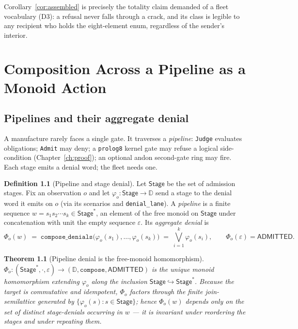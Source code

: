 \documentclass[11pt,oneside]{book}
\theoremstyle{definition}
\newtheorem{definition}{Definition}[chapter]
\theoremstyle{plain}
\newtheorem{theorem}{Theorem}[chapter]
\theoremstyle{remark}
\newcommand{\code}[1]{\texttt{#1}}
\newcommand{\Deny}{\mathbb{D}}                 %
\newcommand{\Adml}{\mathsf{ADMITTED}}          %
\begin{document}
Corollary~\ref{cor:assembled} is precisely the totality claim demanded of a fleet vocabulary
(D3): a refusal never falls through a crack, and its class is legible to any recipient who
holds the eight-element enum, regardless of the sender's interior.

\chapter{Composition Across a Pipeline as a Monoid Action}
\label{ch:pipe}

\section{Pipelines and their aggregate denial}

A manufacture rarely faces a single gate. It traverses a \emph{pipeline}: \code{Judge}
evaluates obligations; \code{Admit} may deny; a \code{prolog8} kernel gate may refuse a logical
side-condition (Chapter~\ref{ch:proof}); an optional andon second-gate ring may fire. Each
stage emits a denial word; the fleet needs one.

\begin{definition}[Pipeline and stage denial]\label{def:pipeline}
Let $\mathsf{Stage}$ be the set of admission stages. Fix an observation $o$ and let
$\varphi_o:\mathsf{Stage}\to\Deny$ send a stage to the denial word it emits on $o$
(via its scenarios and \code{denial\_lane}). A \emph{pipeline} is a finite sequence
$w=s_1 s_2\cdots s_k\in\mathsf{Stage}^{*}$, an element of the free monoid on $\mathsf{Stage}$
under concatenation with unit the empty sequence $\varepsilon$. Its \emph{aggregate denial} is
\[
\Phi_o(w)\;=\;\code{compose\_denials}\bigl(\varphi_o(s_1),\dots,\varphi_o(s_k)\bigr)
\;=\;\bigvee_{i=1}^{k}\varphi_o(s_i),\qquad \Phi_o(\varepsilon)=\Adml.
\]
\end{definition}

\begin{theorem}[Pipeline denial is the free-monoid homomorphism]\label{thm:freehom}
$\Phi_o:(\mathsf{Stage}^{*},\cdot,\varepsilon)\to(\Deny,\code{compose},\Adml)$ is the unique
monoid homomorphism extending $\varphi_o$ along the inclusion
$\mathsf{Stage}\hookrightarrow\mathsf{Stage}^{*}$. Because the target is commutative and
idempotent, $\Phi_o$ factors through the finite join-semilattice generated by
$\{\varphi_o(s):s\in\mathsf{Stage}\}$; hence $\Phi_o(w)$ depends only on the \emph{set} of
distinct stage-denials occurring in $w$ --- it is invariant under reordering the stages and
under repeating them.
\end{theorem}
\end{document}
